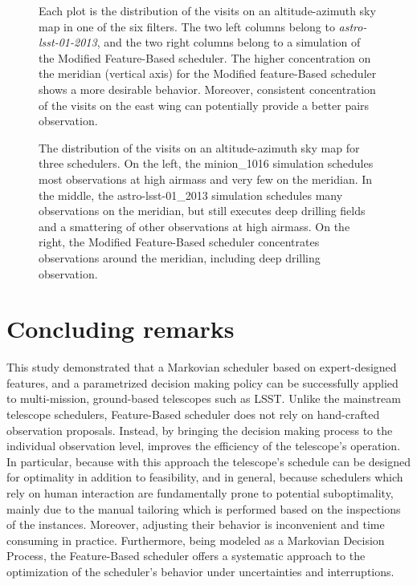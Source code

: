 \documentclass[12pt]{aastex62}
\theoremstyle{definition}
\begin{document}
\begin{figure}[h!]
\caption{Each plot is the distribution of the visits on an altitude-azimuth sky map in one of the six filters. The two left columns belong to \textit{astro-lsst-01-2013}, and the two right columns belong to a simulation of the Modified Feature-Based scheduler. The higher concentration on the meridian (vertical axis) for the Modified feature-Based scheduler shows a more desirable behavior. Moreover, consistent concentration of the visits on the east wing can potentially provide a better pairs observation.}
\label{fig_10yrs_AltAz}
\end{figure}


\begin{figure}
\caption{The distribution of the visits on an altitude-azimuth sky map for three schedulers. On the left, the minion\_1016 simulation schedules most observations at high airmass and very few on the meridian. In the middle, the astro-lsst-01\_2013 simulation schedules many observations on the meridian, but still executes deep drilling fields and a smattering of other observations at high airmass. On the right, the Modified Feature-Based scheduler concentrates observations around the meridian, including deep drilling observation. }\label{fig_all_alt_az}
\end{figure}

\section{Concluding remarks}\label{sec_conclusion}

This study demonstrated that a Markovian scheduler based on expert-designed features, and a parametrized decision making policy can be successfully applied to multi-mission, ground-based telescopes such as LSST. Unlike the mainstream telescope schedulers, Feature-Based scheduler does not rely on hand-crafted observation proposals. Instead, by bringing the decision making process to the individual observation level, improves the efficiency of the telescope's operation. In particular, because with this approach the telescope's schedule can be designed for optimality in addition to feasibility, and in general, because schedulers which rely on human interaction are fundamentally prone to potential suboptimality, mainly due to the manual tailoring which is performed based on the inspections of the instances. Moreover, adjusting their behavior is inconvenient and time consuming in practice. Furthermore, being modeled as a Markovian Decision Process, the Feature-Based scheduler offers a systematic approach to the optimization of the scheduler's behavior under uncertainties and interruptions.
\end{document}
